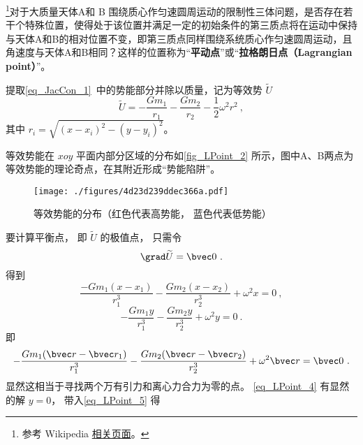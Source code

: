 
\begin{issues}
\issueTODO
\end{issues}


\footnote{参考 Wikipedia \href{https://en.wikipedia.org/wiki/Lagrange_point}{相关页面}。}对于大质量天体A和 B 围绕质心作匀速圆周运动的限制性三体问题，是否存在若干个特殊位置，使得处于该位置并满足一定的初始条件的第三质点将在运动中保持与天体A和B的相对位置不变，即第三质点同样围绕系统质心作匀速圆周运动，且角速度与天体A和B相同？这样的位置称为“\textbf{平动点}”或“\textbf{拉格朗日点（Lagrangian point）}”。

提取\autoref{eq_JacCon_1}~中的势能部分并除以质量，记为等效势 $\widetilde{U}$ 
\begin{equation}
\widetilde{U} = -\frac{Gm_1}{r_1} -\frac{Gm_2}{r_2} -\frac{1}{2}\omega^2 r^2~,
\end{equation}
其中 $r_i = \sqrt{(x - x_i)^2 - (y - y_i)^2}$。

等效势能在 $xoy$ 平面内部分区域的分布如\autoref{fig_LPoint_2} 所示，图中A、B两点为等效势能的理论奇点，在其附近形成“势能陷阱”。 
\begin{figure}[ht]
\centering
\texttt{[image: ./figures/4d23d239ddec366a.pdf]}
\caption{等效势能的分布（红色代表高势能， 蓝色代表低势能）} \label{fig_LPoint_2}
\end{figure}

要计算平衡点， 即 $\widetilde{U}$ 的极值点， 只需令
\begin{equation}
\grad \widetilde{U} = \bvec 0~.
\end{equation}
得到
\begin{equation}\label{eq_LPoint_5}
\frac{-Gm_1(x-x_1)}{r_1^3} - \frac{Gm_2(x-x_2)}{r_2^3} + \omega^2 x = 0~,
\end{equation}
\begin{equation}\label{eq_LPoint_4}
-\frac{Gm_1 y}{r_1^3} - \frac{Gm_2 y}{r_2^3} + \omega^2 y = 0~.
\end{equation}
即
\begin{equation}
-\frac{Gm_1(\bvec r - \bvec r_1)}{r_1^3} - \frac{Gm_2(\bvec r - \bvec r_2)}{r_2^3} + \omega^2 \bvec r = \bvec 0~.
\end{equation}
显然这相当于寻找两个万有引力和离心力合力为零的点。 \autoref{eq_LPoint_4} 有显然的解 $y = 0$， 带入\autoref{eq_LPoint_5} 得

